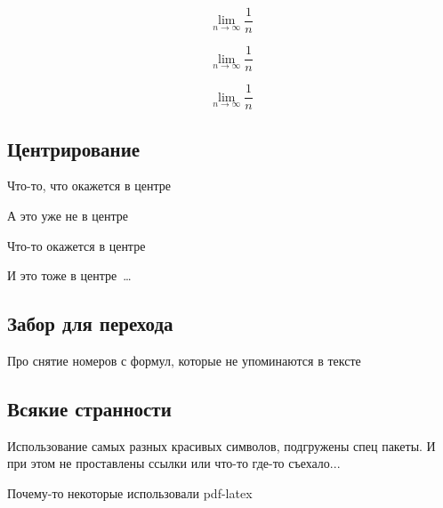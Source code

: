\documentclass[12pt, a4paper]{article}
\begin{document}
\[ \textstyle \lim \limits_{n \to \infty} \frac{1}{n} \]

\[ \textstyle \lim_{n \to \infty} \frac{1}{n} \]

\[ \lim_{n \to \infty} \frac{1}{n} \]


\subsection{Центрирование}

\begin{center}
Что-то, что окажется в центре
\end{center}

А это уже не в центре

\center Что-то окажется в центре

И это тоже в центре~\ldots 



\subsection{Забор для перехода} 



Про снятие номеров с формул, которые не упоминаются в тексте

\subsection{Всякие странности} 

Использование самых разных красивых символов, подгружены спец пакеты. И при этом не проставлены ссылки или что-то где-то съехало... 

Почему-то некоторые использовали pdf-latex
\end{document}
